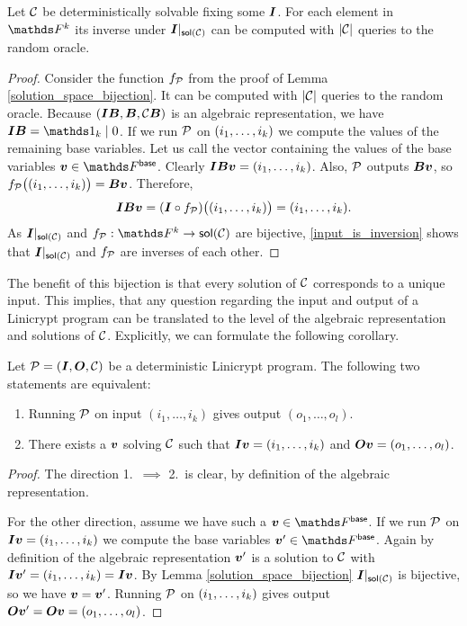 \begin{corollary}
\label{det_solvable_computeable}
    Let $\C$ be deterministically solvable fixing some $\I$.
    For each element in $\F^k$ its inverse under $\I|_{\sol(\C)}$ can be computed with $|\C|$ queries to the random oracle.
\end{corollary}

\begin{proof}
    Consider the function $f_\P$ from the proof of Lemma \ref{solution_space_bijection}.
    It can be computed with $|\C|$ queries to the random oracle.
    Because $(\I\B, \B, \C\B)$ is an algebraic representation,
    we have $\I\B = \Id_k \mid 0$. 
    If we run $\P$ on $(\dts i k)$ we compute the values of the remaining base variables.
    Let us call the vector containing the values of the base variables $\vv \in \Fsp$.
    Clearly $\I\B \vv = (\dts i k)$.
    Also, $\P$ outputs $\B\vv$, so $f_\P\big((\dts i k)\big) = \B\vv$. 
    Therefore, 
    \begin{equation}
    \label{input_is_inversion}
    \I\B \vv = (\I \circ f_\P)\big((\dts i k)\big) = (\dts i k).
    \end{equation}
    As $\I|_{\sol(\C)}$ and $f_\P: \F^k \to \sol(\C)$ are bijective,
    \eqref{input_is_inversion} shows that $\I|_{\sol(\C)}$ and $f_\P$ are inverses of each other.
\end{proof}

The benefit of this bijection is that every solution of $\C$ corresponds to a unique input.
This implies, that any question regarding the input and output of a Linicrypt program can be translated to the level of the algebraic representation and solutions of $\C$.
Explicitly, we can formulate the following corollary.

\begin{corollary}
\label{det_solvable_equiv}
    Let $\P = (\I, \O, \C)$ be a deterministic Linicrypt program.
    The following two statements are equivalent:
    \begin{enumerate}
    \item
        Running $\P$ on input $(i_1, \dots, i_k)$ gives output $(o_1, \dots, o_l)$.
    \item 
        There exists a $\vv$ solving $\C$ such that
        $\I\vv = (\dts i k)$ and
        $\O\vv = (\dts o l)$.
    \end{enumerate}
\end{corollary}

\begin{proof}
    The direction 1.~$\implies$ 2.~is clear, by definition of the algebraic representation.
    
    For the other direction, assume we have such a $\vv \in \Base$.
    If we run $\P$ on $\I\vv = (\dts i k)$ we compute the base variables $\vv' \in \Base$.
    Again by definition of the algebraic representation $\vv'$ is a solution to $\C$ with $\I\vv' = (\dts i k) = \I\vv$.
    By Lemma \ref{solution_space_bijection} $\I|_{\sol(\C)}$ is bijective,
    so we have $\vv = \vv'$.
    Running $\P$ on $(\dts i k)$ gives output $\O\vv' = \O\vv = (\dts o l)$.
\end{proof}

